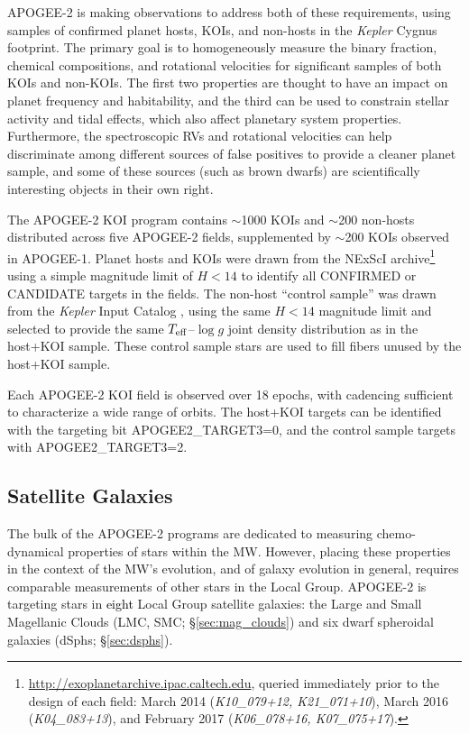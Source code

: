 \documentclass[12pt,twocolumn]{emulateapj}
\begin{document}
APOGEE-2 is making observations to address both of these requirements, using samples of confirmed planet hosts, KOIs, and non-hosts in the {\it Kepler} Cygnus footprint.  The primary goal is to homogeneously measure the binary fraction, chemical compositions, and rotational velocities for significant samples of both KOIs and non-KOIs.  The first two properties are thought to have an impact on planet frequency and habitability, and the third can be used to constrain stellar activity and tidal effects, which also affect planetary system properties.  Furthermore, the spectroscopic RVs and rotational velocities can help discriminate among different sources of false positives to provide a cleaner planet sample, and some of these sources (such as brown dwarfs) are scientifically interesting objects in their own right.

The APOGEE-2 KOI program contains  
$\sim$1000 KOIs and $\sim$200 non-hosts distributed across five APOGEE-2 fields, supplemented by $\sim$200 KOIs observed in APOGEE-1.  Planet hosts and KOIs were drawn from the NExScI archive\footnote{\url{http://exoplanetarchive.ipac.caltech.edu}, queried immediately prior to the design of each field: March 2014 ({\it K10\_079+12, K21\_071+10}), March 2016 ({\it K04\_083+13}), and February 2017 ({\it K06\_078+16, K07\_075+17}).} using a simple magnitude limit of $H<14$ to identify all CONFIRMED or CANDIDATE targets in the fields.  The non-host ``control sample'' was drawn from the {\it Kepler} Input Catalog \citep{Brown_2011_KIC}, using the same $H<14$ magnitude limit and selected to provide the same $T_{\rm eff}$--$\log{g}$ joint density distribution as in the host+KOI sample.  These control sample stars are used to fill fibers unused by the host+KOI sample.  

Each APOGEE-2 KOI field is observed over 18 epochs, with cadencing sufficient to characterize a wide range of orbits.  The host+KOI targets can be identified with the targeting bit APOGEE2\_TARGET3=0, and the control sample targets with APOGEE2\_TARGET3=2.


\subsection{Satellite Galaxies}
\label{sec:sat_galaxies}

The bulk of the APOGEE-2 programs are dedicated to measuring chemo-dynamical properties of stars within the MW.  However, placing these properties in the context of the MW's evolution, and of galaxy evolution in general, requires comparable measurements of other stars in the Local Group.  APOGEE-2 is targeting stars in \textcolor{black}{eight} Local Group satellite galaxies: the Large and Small Magellanic Clouds (LMC, SMC; \S\ref{sec:mag_clouds}) and six dwarf spheroidal galaxies (dSphs; \S\ref{sec:dsphs}).
\end{document}
